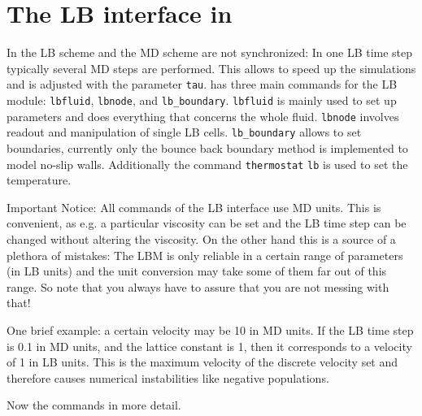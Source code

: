 

\chapter{The LB interface in \ES{}}
In \ES{} the LB scheme and the MD scheme are not synchronized: In one
LB time step typically several MD steps are performed. This allows to speed
up the simulations and is adjusted with the parameter \lstinline|tau|.
\ES{} has three main commands for the LB module: 
 \lstinline|lbfluid|,  \lstinline|lbnode|, and  \lstinline|lb_boundary|.
 \lstinline|lbfluid| is mainly used to set up parameters and does everything that
concerns the whole fluid.  \lstinline|lbnode| involves readout and manipulation of
single LB cells.  \lstinline|lb_boundary| allows to set boundaries, currently only
the bounce back boundary method is implemented to model
no-slip walls. Additionally the command  \lstinline|thermostat| \lstinline|lb| is used to set
the temperature. 

Important Notice: All commands of the LB interface use
MD units. This is convenient, as e.g. a particular 
viscosity can be set and the LB time step can be changed without
altering the viscosity. On the other hand this is a source
of a plethora of mistakes: The LBM is only reliable in a certain 
range of parameters (in LB units) and the unit conversion
may take some of them far out of this range. So note that you always
have to assure that you are not messing with that!

One brief example: a certain velocity may be 10 in MD units.
If the LB time step is 0.1 in MD units, and the lattice constant
is 1, then it corresponds to a velocity of 1 in LB units. 
This is the maximum velocity of the discrete velocity set and therefore
causes numerical instabilities like negative populations.

Now the commands in more detail.

